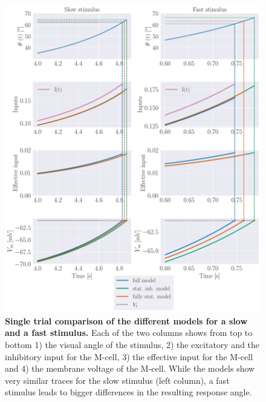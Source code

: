      \begin{figure}[H]
    	\begin{center}
			\includegraphics[width=\textwidth]{figure_voltage_traces.pdf}
    	\end{center}
    	\caption{\textbf{Single trial comparison of the different models for a slow and a fast stimulus.} Each of the two columns shows from top to bottom 1) the visual angle of the stimulus, 2) the excitatory and the inhibitory input for the M-cell, 3) the effective input for the M-cell and 4) the membrane voltage of the M-cell. While the models show very similar traces for the slow stimulus (left column), a fast stimulus leads to bigger differences in the resulting response angle.}
    	\label{fig:voltage_traces}
    \end{figure}
    
